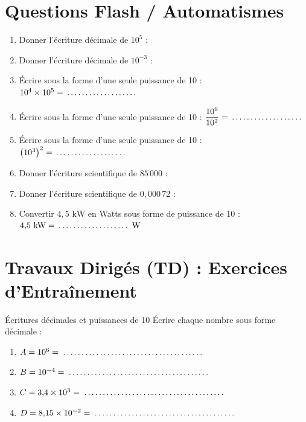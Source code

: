 \section{Questions Flash / Automatismes}

\begin{automatisme}
\begin{enumerate}[label=\textbf{Q\arabic*.}]
    \item Donner l'écriture décimale de $10^5$ : \pointille[5cm]
    \item Donner l'écriture décimale de $10^{-3}$ : \pointille[5cm]
    \item Écrire sous la forme d'une seule puissance de 10 : $10^4 \times 10^5 = \pointille[3cm]$
    \item Écrire sous la forme d'une seule puissance de 10 : $\dfrac{10^9}{10^2} = \pointille[3cm]$
    \item Écrire sous la forme d'une seule puissance de 10 : $\left(10^3\right)^2 = \pointille[3cm]$
    \item Donner l'écriture scientifique de $85\,000$ : \pointille[5cm]
    \item Donner l'écriture scientifique de $0{,}000\,72$ : \pointille[5cm]
    \item Convertir $4{,}5\text{ kW}$ en Watts sous forme de puissance de 10 : $4{,}5\text{ kW} = \pointille[3cm]\text{ W}$
\end{enumerate}
\end{automatisme}

\section{Travaux Dirigés (TD) : Exercices d'Entraînement}

\begin{exercice}[2 pts]{\capSApproprier}{Écritures décimales et puissances de 10}
Écrire chaque nombre sous forme décimale :
\begin{enumerate}
    \item $A = 10^6 = \pointille[6cm]$
    \item $B = 10^{-4} = \pointille[6cm]$
    \item $C = 3{,}4 \times 10^3 = \pointille[6cm]$
    \item $D = 8{,}15 \times 10^{-2} = \pointille[6cm]$
\end{enumerate}
\end{exercice}

